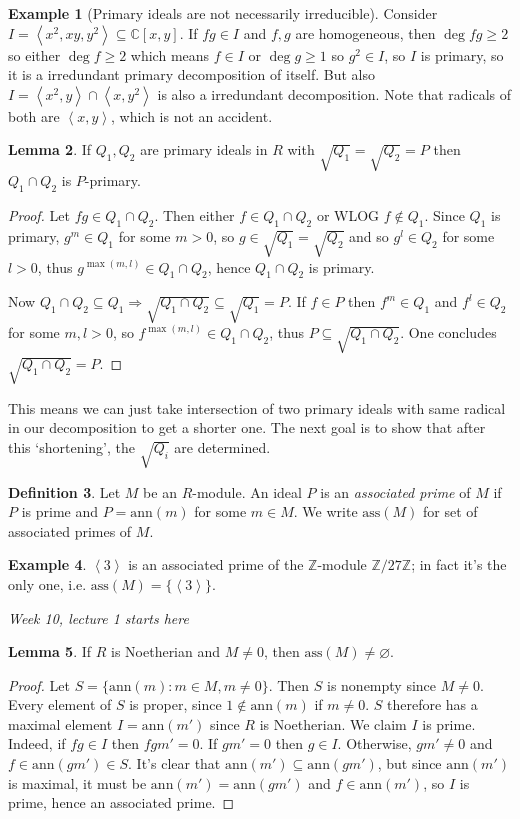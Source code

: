 \documentclass[a4paper]{article}
\newcommand{\la}{\left\langle}
\newcommand{\ra}{\right\rangle}
\newcommand{\Z}{\mathbb Z}
\newcommand{\C}{\mathbb C}
\newcommand{\ass}{\text{ass}}
\newcommand{\ann}{\text{ann}}
\theoremstyle{definition}
\newtheorem{defn}{Definition}[subsection]
\newtheorem{lemma}[defn]{Lemma}
\newtheorem{example}[defn]{Example}
\begin{document}
\begin{example}[Primary ideals are not necessarily irreducible]
Consider $I=\la x^2,xy,y^2\ra\subseteq \C[x,y]$. If $fg\in I$ and $f,g$ are homogeneous, then $\deg fg\geq 2$ so either $\deg f\geq 2$ which means $f\in I$ or $\deg g\geq 1$ so $g^2\in I$, so $I$ is primary, so it is a irredundant primary decomposition of itself. But also $I=\la x^2,y\ra\cap\la x,y^2\ra$ is also a irredundant decomposition. Note that radicals of both are $\la x,y\ra$, which is not an accident.
\end{example}

\begin{lemma}
If $Q_1,Q_2$ are primary ideals in $R$ with $\sqrt{Q_1}=\sqrt{Q_2}=P$ then $Q_1\cap Q_2$ is $P$-primary.
\end{lemma}
\begin{proof}
Let $fg\in Q_1\cap Q_2$. Then either $f\in Q_1\cap Q_2$ or WLOG $f\notin Q_1$. Since $Q_1$ is primary, $g^m\in Q_1$ for some $m>0$, so $g\in\sqrt{Q_1}=\sqrt{Q_2}$ and so $g^l\in Q_2$ for some $l>0$, thus $g^{\max(m,l)}\in Q_1\cap Q_2$, hence $Q_1\cap Q_2$ is primary.

Now $Q_1\cap Q_2\subseteq Q_1\Rightarrow \sqrt{Q_1\cap Q_2}\subseteq \sqrt{Q_1}=P$. If $f\in P$ then $f^m\in Q_1$ and $f^l\in Q_2$ for some $m,l>0$, so $f^{\max(m,l)}\in Q_1\cap Q_2$, thus $P\subseteq\sqrt{Q_1\cap Q_2}$. One concludes $\sqrt{Q_1\cap Q_2}=P$. 
\end{proof}
This means we can just take intersection of two primary ideals with same radical in our decomposition to get a shorter one. The next goal is to show that after this `shortening', the $\sqrt{Q_i}$ are determined.

\begin{defn}
Let $M$ be an $R$-module. An ideal $P$ is an \textit{associated prime} of $M$ if $P$ is prime and $P=\ann(m)$ for some $m\in M$. We write $\ass(M)$ for set of associated primes of $M$.
\end{defn}
\begin{example}
$\la 3\ra$ is an associated prime of the $\Z$-module $\Z/27\Z$; in fact it's the only one, i.e. $\ass(M)=\{\la3\ra\}$.
\end{example}

\begin{flushright}
\textit{Week 10, lecture 1 starts here}
\end{flushright}

\begin{lemma}
\label{nzeromoduleshavenemptyass}
If $R$ is Noetherian and $M\neq 0$, then $\ass(M)\neq\varnothing$. 
\end{lemma}
\begin{proof}
Let $S=\{\ann(m):m\in M,m\neq 0\}$. Then $S$ is nonempty since $M\neq 0$. Every element of $S$ is proper, since $1\notin\ann(m)$ if $m\neq 0$. $S$ therefore has a maximal element $I=\ann(m')$ since $R$ is Noetherian. We claim $I$ is prime. Indeed, if $fg\in I$ then $fgm'=0$. If $gm'=0$ then $g\in I$. Otherwise, $gm'\neq 0$ and $f\in\ann (gm')\in S$. It's clear that $\ann(m')\subseteq\ann(gm')$, but since $\ann(m')$ is maximal, it must be $\ann(m')=\ann(gm')$ and $f\in\ann(m')$, so $I$ is prime, hence an associated prime.
\end{proof}
\end{document}
